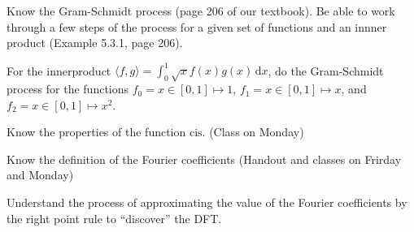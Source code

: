 \documentclass[12pt,fleqn]{exam}
\begin{document}
\begin{questions}
\item Know the Gram-Schmidt process (page 206 of our textbook). Be able to work through a few steps of the process for
a given set of functions and an innner product (Example 5.3.1, page 206).

\item For the innerproduct $\langle f, g \rangle = \int_{0}^{1} \sqrt{x} f(x) g(x) \, \mathrm{d} x$, do the Gram-Schmidt
process for the functions $f_0 = x \in [0,1] \mapsto 1$, $f_1 = x \in [0,1] \mapsto x$, 
and $f_2 = x \in [0,1] \mapsto x^2$.

\item Know the properties of the function $\mathrm{cis}$. (Class on Monday)

\item Know the definition of the Fourier coefficients (Handout and classes on Frirday and Monday)

\item Understand the process of approximating the value of the  Fourier coefficients by the right point rule to ``discover''
the DFT.

\end{questions}
\end{document}
